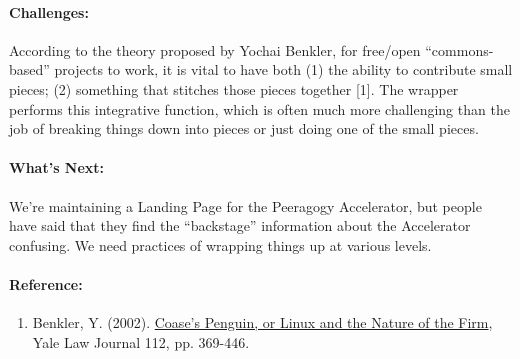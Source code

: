 \paragraph{Challenges:} According to the theory proposed by Yochai Benkler,
for free/open ``commons-based'' projects to work, it is vital to have
both (1) the ability to contribute small pieces; (2) something that
stitches those pieces together {[}1{]}. The wrapper performs this
integrative function, which is often much more challenging than the job
of breaking things down into pieces or just doing one of the small
pieces.

\paragraph{What's Next:} We're maintaining a Landing Page for the Peeragogy
Accelerator, but people have said that they find the ``backstage''
information about the Accelerator confusing. We need practices of
wrapping things up at various levels.

\paragraph{Reference:}

\begin{enumerate}
\itemsep1pt\parskip0pt
\item
  Benkler, Y.
  (2002). \href{http://www.yale.edu/yalelj/112/BenklerWEB.pdf}{Coase's
  Penguin, or Linux and the Nature of the Firm}, Yale Law Journal 112,
  pp. 369-446.
\end{enumerate}
